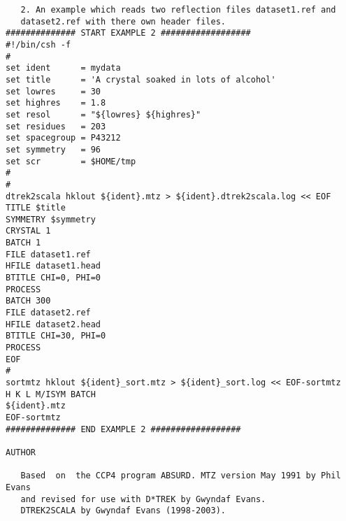 \documentclass[a4paper, 11pt]{article}
\begin{document}
{\begin{verbatim}
   2. An example which reads two reflection files dataset1.ref and
   dataset2.ref with there own header files.
############## START EXAMPLE 2 ##################
#!/bin/csh -f
#
set ident      = mydata
set title      = 'A crystal soaked in lots of alcohol'
set lowres     = 30
set highres    = 1.8
set resol      = "${lowres} ${highres}"
set residues   = 203
set spacegroup = P43212
set symmetry   = 96
set scr        = $HOME/tmp
#
#
dtrek2scala hklout ${ident}.mtz > ${ident}.dtrek2scala.log << EOF
TITLE $title
SYMMETRY $symmetry
CRYSTAL 1
BATCH 1
FILE dataset1.ref
HFILE dataset1.head
BTITLE CHI=0, PHI=0
PROCESS
BATCH 300
FILE dataset2.ref
HFILE dataset2.head
BTITLE CHI=30, PHI=0
PROCESS
EOF
#
sortmtz hklout ${ident}_sort.mtz > ${ident}_sort.log << EOF-sortmtz
H K L M/ISYM BATCH
${ident}.mtz
EOF-sortmtz
############## END EXAMPLE 2 ##################

AUTHOR

   Based  on  the CCP4 program ABSURD. MTZ version May 1991 by Phil Evans
   and revised for use with D*TREK by Gwyndaf Evans.
   DTREK2SCALA by Gwyndaf Evans (1998-2003).
\end{verbatim}
}
\end{document}
